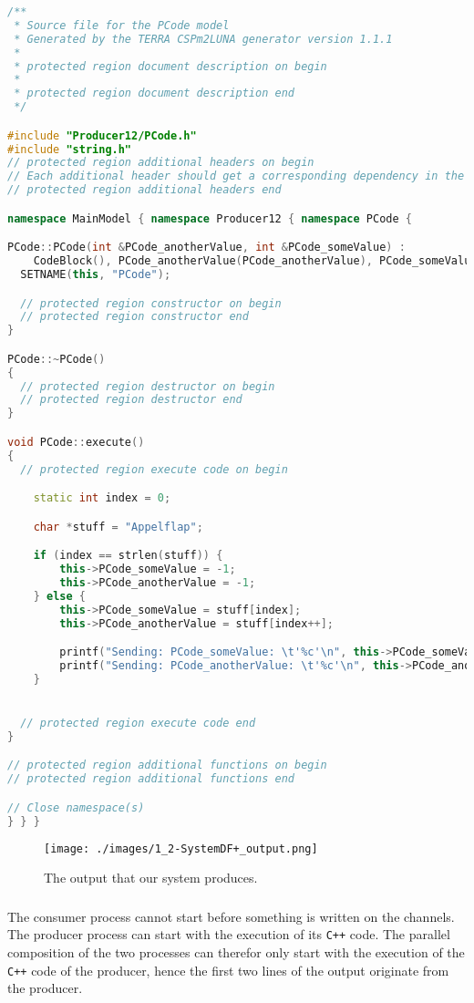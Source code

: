 \documentclass[a4paper,twoside,11pt]{article}
\newcommand{\cpp}{{\tt C++} }
\begin{document}
\begin{lstlisting}[caption=Producer12/PCode.cpp, label=code:1_2producer, language=C++]
/**
 * Source file for the PCode model
 * Generated by the TERRA CSPm2LUNA generator version 1.1.1
 *
 * protected region document description on begin
 *
 * protected region document description end
 */

#include "Producer12/PCode.h"
#include "string.h"
// protected region additional headers on begin
// Each additional header should get a corresponding dependency in the Makefile
// protected region additional headers end

namespace MainModel { namespace Producer12 { namespace PCode { 

PCode::PCode(int &PCode_anotherValue, int &PCode_someValue) :
    CodeBlock(), PCode_anotherValue(PCode_anotherValue), PCode_someValue(PCode_someValue){
  SETNAME(this, "PCode");

  // protected region constructor on begin
  // protected region constructor end
}

PCode::~PCode()
{
  // protected region destructor on begin
  // protected region destructor end
}

void PCode::execute()
{
  // protected region execute code on begin

	static int index = 0;

	char *stuff = "Appelflap";

	if (index == strlen(stuff)) {
		this->PCode_someValue = -1;
		this->PCode_anotherValue = -1;
	} else {
		this->PCode_someValue = stuff[index];
		this->PCode_anotherValue = stuff[index++];

		printf("Sending: PCode_someValue: \t'%c'\n", this->PCode_someValue);
		printf("Sending: PCode_anotherValue: \t'%c'\n", this->PCode_anotherValue);
	}


  // protected region execute code end
}

// protected region additional functions on begin
// protected region additional functions end

// Close namespace(s)
} } } 
\end{lstlisting}

\begin{figure}
 \centering
 \texttt{[image: ./images/1\_2-SystemDF+\_output.png]}
 \caption{The output that our system produces.}
 \label{fig:SystemDF+_output}
\end{figure}
\FloatBarrier
\subsubsection{}
The consumer process cannot start before something is written on the channels. The producer process can start with the execution of its \cpp code. The parallel composition of the two processes can therefor only start with the execution of the \cpp code of the producer, hence the first two lines of the output originate from the producer.
\end{document}
